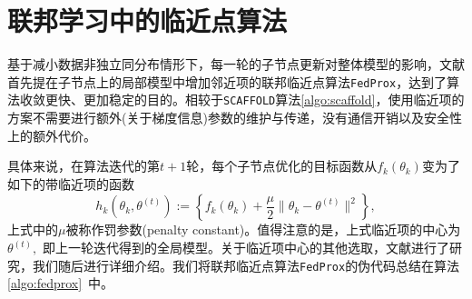 \section{联邦学习中的临近点算法}
\label{sec:chap2-ppa}

基于减小数据非独立同分布情形下，每一轮的子节点更新对整体模型的影响，文献\parencite{sahu2018fedprox}首先提在子节点上的局部模型中增加邻近项的联邦临近点算法\texttt{FedProx}，达到了算法收敛更快、更加稳定的目的。相较于\texttt{SCAFFOLD}算法\ref{algo:scaffold}，使用临近项的方案不需要进行额外(关于梯度信息)参数的维护与传递，没有通信开销以及安全性上的额外代价。

具体来说，在算法迭代的第$t+1$轮，每个子节点优化的目标函数从$f_k(\theta_k)$变为了如下的带临近项的函数
\begin{equation}
\label{eq:fedprox}
h_k(\theta_k, \theta^{(t)}) := \left\{ f_k(\theta_k) + \frac{\mu}{2} \lVert \theta_k - \theta^{(t)} \rVert^2  \right\},
\end{equation}
上式中的$\mu$被称作罚参数(penalty constant)。值得注意的是，上式临近项的中心为$\theta^{(t)},$ 即上一轮迭代得到的全局模型。关于临近项中心的其他选取，文献\parencite{hanzely2020federated,li_2021_ditto}进行了研究，我们随后进行详细介绍。我们将联邦临近点算法\texttt{FedProx}的伪代码总结在算法\ref{algo:fedprox}~中。



